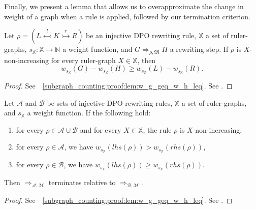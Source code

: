 Finally, we present a lemma that allows us to overapproximate the change in weight of a graph when a rule is applied, followed by our termination criterion. 

\begin{lemma}
    \label{subgraph_counting:lem:w_g_geq_w_h_leq}
    Let $\rho \mathop{=} (L \overset{l}{\leftarrowtail} K \overset{r}{\rightarrowtail} R)$ be an injective DPO rewriting rule,
    \( \mathbb{X} \) a set of ruler-graphs,
    \( s_{\mathbb{X}} \mathop{\colon} \mathbb{X} \mathop{\to} \mathbb{N} \) a weight function,
    and \( G \mathop{\Rightarrow}_{\rho,\mathfrak{M}} H \) a rewriting step. 
    If $\rho$ is \( X \)-non-increasing for every ruler-graph \( X \mathop{\in} \mathbb{X} \), then 
    $$
        w_{s_\mathbb{X}}(G) - w_{s_\mathbb{X}}(H) 
        \mathop{\geq} 
        w_{s_\mathbb{X}}(L) - w_{s_\mathbb{X}}(R).
    $$
\end{lemma}
\begin{proof}
    \iflongversion
        See~\textsection~\ref{subgraph_counting:proof:lem:w_g_geq_w_h_leq}.
    \else
        See \cite[Lemma 41]{qiu2025termination}.
    \fi 
\end{proof} 
\begin{theorem}[Termination] 
    \label{subgraph_counting:thm:termination_grs}
    Let \(\mathcal{A}\) and \(\mathcal{B}\) be sets of injective DPO rewriting rules, $\mathbb{X}$ a set of ruler-graphs, and $s_\mathbb{X}$ a weight function. If the following hold:
    \begin{enumerate}
        \item  for every $\rho \mathop{\in} \mathcal{A} \mathop{\cup} \mathcal{B}$ and for every $X \mathop{\in} \mathbb{X}$, the rule $\rho$ is $X$-non-increasing,
        \item for every \(\rho \mathop{\in} \mathcal{A}\), we have \( w_{s_\mathbb{X}}(lhs(\rho)) \mathop{>} w_{s_\mathbb{X}}(rhs(\rho)) \),
        \item for every \(\rho \mathop{\in} \mathcal{B}\), we have \( w_{s_\mathbb{X}}(lhs(\rho)) \mathop{\geq} w_{s_\mathbb{X}}(rhs(\rho)) \).
    \end{enumerate}
    Then \(\mathop{\Rightarrow}_{\mathcal{A},\mathcal{M}}\) terminates relative to \(\mathop{\Rightarrow}_{\mathcal{B},\mathcal{M}}\).
\end{theorem}
\begin{proof}
    \iflongversion
        See~\textsection~\ref{subgraph_counting:proof:lem:w_g_geq_w_h_leq}.
    \else
        See \cite[Lemma 41]{qiu2025termination}.
    \fi 
\end{proof} 